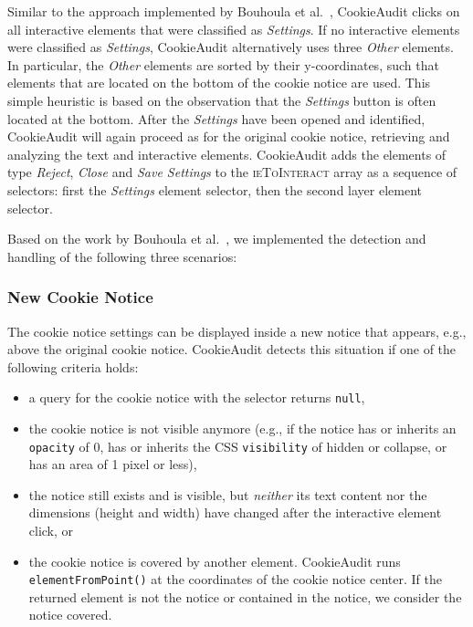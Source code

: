 Similar to the approach implemented by Bouhoula et al.~\cite{bouhoula2023automated}, CookieAudit clicks on all interactive elements that were classified as \emph{Settings}.
If no interactive elements were classified as \emph{Settings}, CookieAudit alternatively uses three \emph{Other} elements. 
In particular, the \emph{Other} elements are sorted by their y-coordinates, such that elements that are located on the bottom of the cookie notice are used.
This simple heuristic is based on the observation that the \emph{Settings} button is often located at the bottom.
After the \emph{Settings} have been opened and identified, CookieAudit will again proceed as for the original cookie notice, retrieving and analyzing the text and interactive elements.
CookieAudit adds the elements of type \emph{Reject}, \emph{Close} and \emph{Save Settings} to the \textsc{ieToInteract} array as a sequence of selectors: first the \emph{Settings} element selector, then the second layer element selector. 

Based on the work by Bouhoula et al.~\cite{bouhoula2023automated}, we implemented the detection and handling of the following three scenarios:

\subsubsection{New Cookie Notice}
The cookie notice settings can be displayed inside a new notice that appears, e.g., above the original cookie notice. 
CookieAudit detects this situation if one of the following criteria holds:

\begin{itemize} 
    \item a query for the cookie notice with the selector returns \verb|null|,
    \item the cookie notice is not visible anymore (e.g., if the notice has or inherits an \verb|opacity| of 0, has or inherits the CSS \verb|visibility| of hidden or collapse, or has an area of 1 pixel or less),
    \item the notice still exists and is visible, but \emph{neither} its text content nor the dimensions (height and width) have changed after the interactive element click, or
    \item the cookie notice is covered by another element. CookieAudit runs \verb|elementFromPoint()| at the coordinates of the cookie notice center. If the returned element is not the notice or contained in the notice, we consider the notice covered.
\end{itemize}


